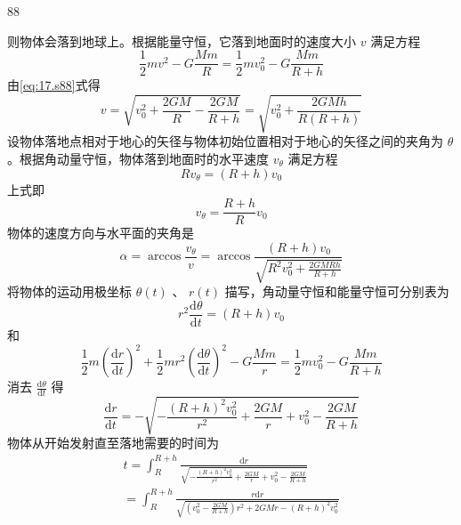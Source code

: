 \begin{solution}{88}
\begin{subsolution}
则物体会落到地球上。根据能量守恒，它落到地面时的速度大小 $v$ 满足方程
\begin{equation}
\frac {1}{2} m v ^ {2} - G \frac {M m}{R} = \frac {1}{2} m v _ {0} ^ {2} - G \frac {M m}{R + h}
\label{eq:17.s88}
\end{equation}
由\eqref{eq:17.s88}式得
\begin{equation}
v = \sqrt {v _ {0} ^ {2} + \frac {2 G M}{R} - \frac {2 G M}{R + h}} = \sqrt {v _ {0} ^ {2} + \frac {2 G M h}{R (R + h)}}
\label{eq:18.s88}
\end{equation}
设物体落地点相对于地心的矢径与物体初始位置相对于地心的矢径之间的夹角为 $\theta$ 。根据角动量守恒，物体落到地面时的水平速度 $v_{\theta}$ 满足方程
\begin{equation}
R v _ {\theta} = (R + h) v _ {0}
\label{eq:19.s88}
\end{equation}
上式即
\begin{equation}
v _ {\theta} = \frac {R + h}{R} v _ {0}
\label{eq:20.s88}
\end{equation}
物体的速度方向与水平面的夹角是
\begin{equation}
\alpha = \arccos \frac {v _ {\theta}}{v} = \arccos \frac {(R + h) v _ {0}}{\sqrt {R ^ {2} v _ {0} ^ {2} + \frac {2 G M R h}{R + h}}}
\label{eq:21.s88}
\end{equation}
将物体的运动用极坐标 $\theta(t)$ 、 $r(t)$ 描写，角动量守恒和能量守恒可分别表为
\begin{equation}
r ^ {2} \frac {\mathrm{d} \theta}{\mathrm{d} t} = (R + h) v _ {0}
\label{eq:22.s88}
\end{equation}
和
\begin{equation}
\frac {1}{2} m \left(\frac {\mathrm{d} r}{\mathrm{d} t}\right) ^ {2} + \frac {1}{2} m r ^ {2} \left(\frac {\mathrm{d} \theta}{\mathrm{d} t}\right) ^ {2} - G \frac {M m}{r} = \frac {1}{2} m v _ {0} ^ {2} - G \frac {M m}{R + h}
\label{eq:23.s88}
\end{equation}
消去 $\frac{\mathrm{d}\theta}{\mathrm{d}t}$ 得
\begin{equation}
\frac {\mathrm{d} r}{\mathrm{d} t} = - \sqrt {- \frac {(R + h) ^ {2} v _ {0} ^ {2}}{r ^ {2}} + \frac {2 G M}{r} + v _ {0} ^ {2} - \frac {2 G M}{R + h}}
\label{eq:24.s88}
\end{equation}
物体从开始发射直至落地需要的时间为
\begin{equation}
\begin{array}{l} t = \int_ {R} ^ {R + h} \frac {\mathrm{d} r}{\sqrt {- \frac {(R + h) ^ {2} v _ {0} ^ {2}}{r ^ {2}} + \frac {2 G M}{r} + v _ {0} ^ {2} - \frac {2 G M}{R + h}}} \\ = \int_ {R} ^ {R + h} \frac {r \mathrm{d} r}{\sqrt {\left(v _ {0} ^ {2} - \frac {2 G M}{R + h}\right) r ^ {2} + 2 G M r - (R + h) ^ {2} v _ {0} ^ {2}}} \end{array}

\end{equation}
\end{subsolution}
\end{solution}
